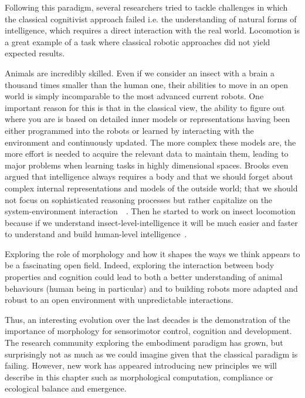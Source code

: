 Following this paradigm, several researchers tried to tackle challenges in which the classical cognitivist approach failed i.e. the understanding of natural forms of intelligence, which requires a direct interaction with the real world. Locomotion is a great example of a task where classical robotic approaches did not yield expected results.

Animals are incredibly skilled. Even if we consider an insect with a brain a thousand times smaller than the human one, their abilities to move in an open world is simply incomparable to the most advanced current robots. One important reason for this is that in the classical view, the ability to figure out where you are is based on detailed inner models or representations having been either programmed into the robots or learned by interacting with the environment and continuously updated. The more complex these models are, the more effort is needed to acquire the relevant data to maintain them, leading to major problems when learning tasks in highly dimensional spaces. Brooks even argued that intelligence always requires a body and that we should forget about complex internal representations and models of the outside world; that we should not focus on sophisticated reasoning processes but rather capitalize on the system-environment interaction~\parencite{brooks1991intelligence}~\parencite{brooks1995intelligence}. Then he started to work on insect locomotion because if we understand insect-level-intelligence it will be much easier and faster to understand and build human-level intelligence~\parencite{brooks1996prospects}.


Exploring the role of morphology and how it shapes the ways we think appears to be a fascinating open field. Indeed, exploring the interaction between body properties and cognition could lead to both a better understanding of animal behaviours (human being in particular) and to building robots more adapted and robust to an open environment with unpredictable interactions.

Thus, an interesting evolution over the last decades is the demonstration of the importance of morphology for sensorimotor control, cognition and development. The research community exploring the embodiment paradigm has grown, but surprisingly not as much as we could imagine given that the classical paradigm is failing. However, new work has appeared introducing new principles we will describe in this chapter such as morphological computation, compliance or ecological balance and emergence.

